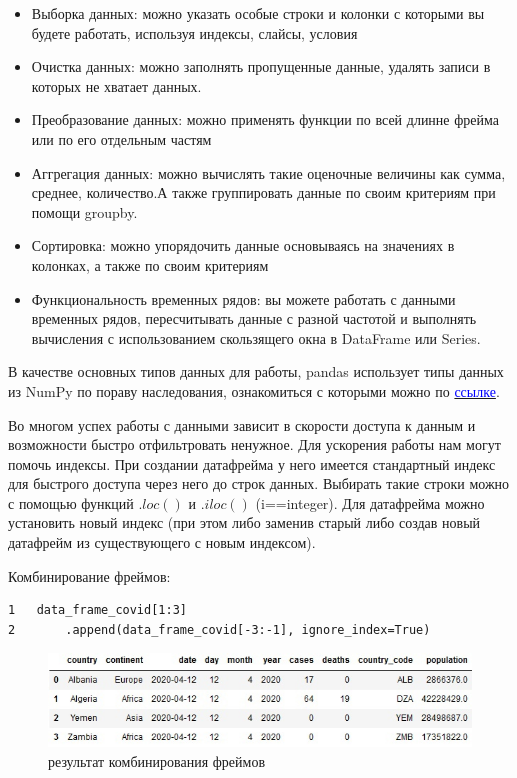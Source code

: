 \documentclass[12pt, a4paper]{article}
\begin{document}
{\begin{itemize}
    \item Выборка данных: можно указать особые строки и колонки 
    с которыми вы будете работать, используя индексы, слайсы, 
    условия
    \item Очистка данных: можно заполнять пропущенные данные, 
    удалять записи в которых не хватает данных.
    \item Преобразование данных: можно применять функции по всей 
    длинне фрейма или по его отдельным частям
    \item Аггрегация данных: можно вычислять такие оценочные 
    величины как сумма, среднее, количество.А также группировать 
    данные по своим критериям при помощи groupby.
    \item Сортировка: можно упорядочить данные основываясь на 
    значениях в колонках, а также по своим критериям
    \item Функциональность временных рядов: вы можете работать 
    с данными временных рядов, пересчитывать данные с разной 
    частотой и выполнять вычисления с использованием скользящего 
    окна в DataFrame или Series.
\end{itemize}

В качестве основных типов данных для работы, pandas использует 
типы данных из NumPy по пораву наследования, ознакомиться с 
которыми можно по \href{https://pandas.pydata.org/pandas-docs/
stable/reference/arrays.html}{\textcolor{blue}{ссылке}}.

\vspace{1em}

Во многом успех работы с данными зависит в скорости доступа 
к данным и возможности быстро отфильтровать ненужное. Для 
ускорения работы нам могут помочь индексы. При создании 
датафрейма у него имеется стандартный индекс для быстрого 
доступа через него до строк данных. Выбирать такие строки 
можно с помощью функций \(.loc()\) и \(.iloc()\) (i==integer). Для 
датафрейма можно установить новый индекс (при этом либо 
заменив старый либо создав новый датафрейм из существующего 
с новым индексом).

\newpage

Комбинирование фреймов:
\begin{verbatim}
1   data_frame_covid[1:3]
2       .append(data_frame_covid[-3:-1], ignore_index=True)    
\end{verbatim}

\begin{figure}[h]
    \begin{center}
        \includegraphics[scale=0.5,keepaspectratio]
        {Pictures/Picture_1.jpg}
        \caption{результат комбинирования фреймов}
        \label{Picture_1}
    \end{center}
\end{figure}

}
\end{document}
